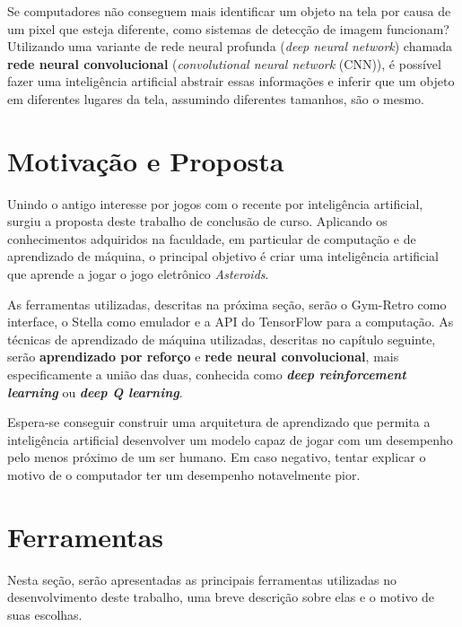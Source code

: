 Se computadores não conseguem mais identificar um objeto na tela por causa de um pixel que esteja diferente, como sistemas de detecção de imagem funcionam?
Utilizando uma variante de rede neural profunda (\textit{deep neural network}) chamada \textbf{rede neural convolucional} (\textit{convolutional neural network} (CNN)), é possível fazer uma inteligência artificial abstrair essas informações e inferir que um objeto em diferentes lugares da tela, assumindo diferentes tamanhos, são o mesmo.

\section{Motivação e Proposta}
\label{sec:motivacao_proposta}

Unindo o antigo interesse por jogos com o recente por inteligência artificial, surgiu a proposta deste trabalho de conclusão de curso.
Aplicando os conhecimentos adquiridos na faculdade, em particular de computação e de aprendizado de máquina, o principal objetivo é criar uma inteligência artificial que aprende a jogar o jogo eletrônico \textit{Asteroids}.

As ferramentas utilizadas, descritas na próxima seção, serão o Gym-Retro como interface, o Stella como emulador e a API do TensorFlow para a computação.
As técnicas de aprendizado de máquina utilizadas, descritas no capítulo seguinte, serão \textbf{aprendizado por reforço} e \textbf{rede neural convolucional}, mais especificamente a união das duas, conhecida como \textit{\textbf{deep reinforcement learning}} ou \textit{\textbf{deep Q learning}}.

Espera-se conseguir construir uma arquitetura de aprendizado que permita a inteligência artificial desenvolver um modelo capaz de jogar com um desempenho pelo menos próximo de um ser humano.
Em caso negativo, tentar explicar o motivo de o computador ter um desempenho notavelmente pior.

\section{Ferramentas}
\label{sec:tools}
Nesta seção, serão apresentadas as principais ferramentas utilizadas no desenvolvimento deste trabalho, uma breve descrição sobre elas e o motivo de suas escolhas.

